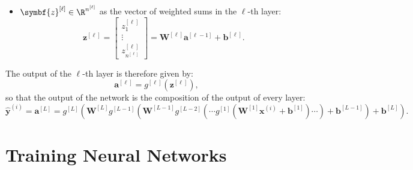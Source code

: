 \documentclass{article}
\begin{document}
\begin{itemize}
\begin{equation*}
\begin{bmatrix}
                  b_1^{\left[ \ell \right]} \\
                  \vdots                    \\
                  b_{n^{\left[ \ell \right]}}^{\left[ \ell \right]}
              \end{bmatrix}
              .
          \end{equation*}
    \item \(\symbf{z}^{\left[ \ell \right]} \in \R^{n^{\left[ \ell \right]}}\) as the vector of weighted sums in the \(\ell\)-th layer:
          \begin{equation*}
              \symbf{z}^{\left[ \ell \right]} =
              \begin{bmatrix}
                  z_1^{\left[ \ell \right]} \\
                  \vdots                    \\
                  z_{n^{\left[ \ell \right]}}^{\left[ \ell \right]}
              \end{bmatrix}
              = \symbf{W}^{\left[ \ell \right]} \symbf{a}^{\left[ \ell - 1 \right]} + \symbf{b}^{\left[ \ell \right]}.
          \end{equation*}
\end{itemize}
The output of the \(\ell\)-th layer is therefore given by:
\begin{equation*}
    \symbf{a}^{\left[ \ell \right]} = g^{\left[ \ell \right]}\left( \symbf{z}^{\left[ \ell \right]} \right),
\end{equation*}
so that the output of the network is the composition of the output of
every layer:
\begin{equation*}
    \hat{\symbf{y}}^{\left( i \right)} = \symbf{a}^{\left[ L \right]} = g^{\left[ L \right]}\left( \symbf{W}^{\left[ L \right]} g^{\left[ L - 1 \right]}\left( \symbf{W}^{\left[ L - 1 \right]} g^{\left[ L - 2 \right]}\left( \cdots g^{\left[ 1 \right]}\left( \symbf{W}^{\left[ 1 \right]} \symbf{x}^{\left( i \right)} + \symbf{b}^{\left[ 1 \right]} \right) \cdots \right) + \symbf{b}^{\left[ L - 1 \right]} \right) + \symbf{b}^{\left[ L \right]} \right).
\end{equation*}
\section{Training Neural Networks}
\end{document}
